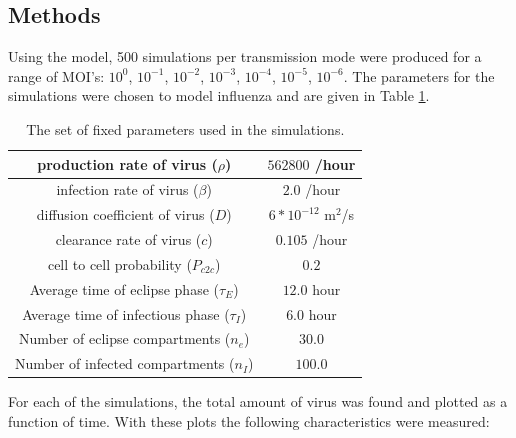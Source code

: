 \documentclass[a4paper]{article}
\begin{document}
%

\subsection{Methods}
Using the model, 500 simulations per transmission mode were produced for a range of MOI's: $10^{0}$, $10^{-1}$, $10^{-2}$, $10^{-3}$, $10^{-4}$, $10^{-5}$, $10^{-6}$. The parameters for the simulations were chosen to model influenza \cite{Beauchemin} and are given in Table \ref{tab:parameters}.

\begin{table}[h]
    \centering
    \caption{The set of fixed parameters used in the simulations.}
    \begin{tabular}{|c|c|}
        \hline
        production rate of virus ($\rho$)  & $562800$ /hour\\
        \hline
        infection rate of virus ($\beta$) & $2.0$ /hour\\
        \hline
        diffusion coefficient of virus ($D$) & $6*10^{-12}$ $\mathrm{m}^2$/s\\
        \hline
        clearance rate of virus ($c$) & $0.105$ /hour\\
        \hline
        cell to cell probability ($P_{c2c}$) & $0.2$\\
        \hline
        Average time of eclipse phase ($\tau_E$) & $12.0$ hour\\
        \hline
        Average time of infectious phase ($\tau_I$) & $6.0$ hour\\
        \hline
        Number of eclipse compartments ($n_e$) & $30.0$\\
        \hline
        Number of infected compartments ($n_I$) & $100.0$\\
        \hline
    \end{tabular}
    \label{tab:parameters}
\end{table}


\noindent
For each of the simulations, the total amount of virus was found and plotted as a function of time. With these plots the following characteristics were measured:
\end{document}
